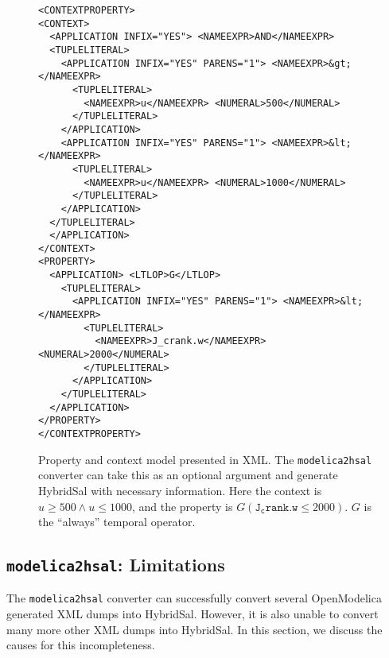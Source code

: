 \documentclass{llncs}
\begin{document}
\begin{figure}[t]
\begin{tt}
\begin{verbatim}
<CONTEXTPROPERTY>
<CONTEXT>
  <APPLICATION INFIX="YES"> <NAMEEXPR>AND</NAMEEXPR>
  <TUPLELITERAL>
    <APPLICATION INFIX="YES" PARENS="1"> <NAMEEXPR>&gt;</NAMEEXPR>
      <TUPLELITERAL>
        <NAMEEXPR>u</NAMEEXPR> <NUMERAL>500</NUMERAL>
      </TUPLELITERAL>
    </APPLICATION>
    <APPLICATION INFIX="YES" PARENS="1"> <NAMEEXPR>&lt;</NAMEEXPR>
      <TUPLELITERAL> 
        <NAMEEXPR>u</NAMEEXPR> <NUMERAL>1000</NUMERAL>
      </TUPLELITERAL>
    </APPLICATION>
  </TUPLELITERAL>
  </APPLICATION>
</CONTEXT>
<PROPERTY>
  <APPLICATION> <LTLOP>G</LTLOP>
    <TUPLELITERAL>
      <APPLICATION INFIX="YES" PARENS="1"> <NAMEEXPR>&lt;</NAMEEXPR>
        <TUPLELITERAL> 
          <NAMEEXPR>J_crank.w</NAMEEXPR> <NUMERAL>2000</NUMERAL> 
        </TUPLELITERAL>
      </APPLICATION>
    </TUPLELITERAL>
  </APPLICATION>
</PROPERTY>
</CONTEXTPROPERTY>
\end{verbatim}
\end{tt}
\caption{Property and context model presented in XML. The {\tt{modelica2hsal}}
converter can take this as an optional argument and generate HybridSal 
with necessary information. Here the context is $u \geq 500 \wedge u \leq 1000$,
and the property is $G( \mathtt{J_crank.w} \leq 2000)$. 
$G$ is the ``always'' temporal operator.
}\label{fig-xml}
\end{figure}

\subsection{{\tt{modelica2hsal}}: Limitations}

The {\tt{modelica2hsal}} converter can successfully 
convert several OpenModelica generated XML dumps into
HybridSal.  However, it is also unable to convert
many more other XML dumps into HybridSal.
In this section, we discuss the causes for this
incompleteness.
\end{document}

